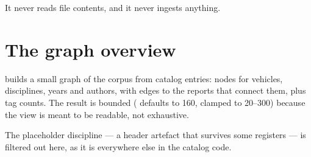 It never reads file contents, and it never ingests anything.

\section{The graph overview}

 builds a small graph of the corpus from catalog
entries: nodes for vehicles, disciplines, years and authors, with edges to the
reports that connect them, plus tag counts. The result is bounded (
defaults to 160, clamped to 20--300) because the view is meant to be readable,
not exhaustive.

The  placeholder discipline --- a header artefact that
survives some registers --- is filtered out here, as it is everywhere else in the
catalog code.
